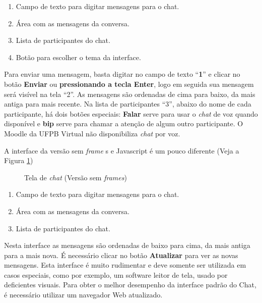 \begin{enumerate}
 \item Campo de texto para digitar mensagens para o chat.
\item Área com as mensagens da conversa.
\item Lista de participantes do chat.
\item Botão para escolher o tema da interface.
\end{enumerate}

Para enviar uma mensagem, basta digitar no campo de texto “\textbf{1}” e clicar no botão \textbf{Enviar} ou \textbf{pressionando a tecla Enter}, logo em seguida sua mensagem será visível na tela “2”. As mensagens são ordenadas de cima para baixo, da mais antiga para mais recente. Na lista de participantes “3”, abaixo do nome de cada participante, há dois botões especiais: \textbf{Falar} serve para usar o  \textit{chat} de voz quando disponível e \textbf{bip} serve para chamar a atenção de algum outro participante. O Moodle da UFPB Virtual não disponibiliza  \textit{chat} por voz.

A interface da versão sem   \textit{frame} s e Javascript é um pouco diferente (Veja a Figura \ref{fig:cap5_15})

\begin{figure}[htbp]
 \begin{center}
  \caption{Tela de  \textit{chat} (Versão sem  \textit{frames})}
  \label{fig:cap5_15}
 \end{center}
\end{figure}

\begin{enumerate}
 \item Campo de texto para digitar mensagens para o chat.
\item Área com as mensagens da conversa.
\item	Lista de participantes do chat.
\end{enumerate}

Nesta interface as mensagens são ordenadas de baixo para cima, da mais antiga para a mais nova. É necessário clicar no botão\textbf{ Atualizar} para ver as novas mensagens. Esta interface é muito rudimentar e deve somente ser utilizada em casos especiais, como por exemplo, um software leitor de tela, usado por deficientes visuais. Para obter o melhor desempenho da interface padrão do Chat, é necessário utilizar um navegador Web atualizado.

